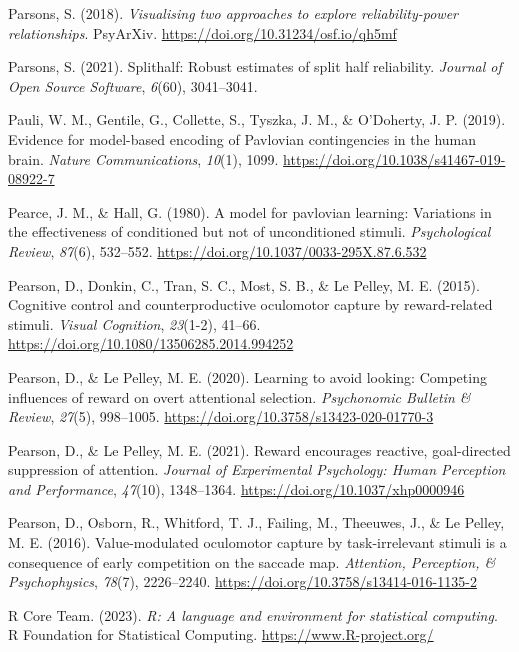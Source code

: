 \documentclass[
  man,
  floatsintext,
  longtable,
  nolmodern,
  notxfonts,
  notimes,
  mask,
  colorlinks=true,linkcolor=blue,citecolor=blue,urlcolor=blue]{apa7}
\newlength{\cslhangindent}
\newenvironment{CSLReferences}[2] %
 {\begin{list}{}{%
  \setlength{\itemindent}{0pt}
  \setlength{\leftmargin}{0pt}
  \setlength{\parsep}{0pt}
  \ifodd #1
   \setlength{\leftmargin}{\cslhangindent}
   \setlength{\itemindent}{-1\cslhangindent}
  \fi
  \setlength{\itemsep}{#2\baselineskip}}}
 {\end{list}}
\begin{document}
\begin{CSLReferences}{1}{0}
Parsons, S. (2018). \emph{Visualising two approaches to explore
reliability-power relationships}. PsyArXiv.
\url{https://doi.org/10.31234/osf.io/qh5mf}

Parsons, S. (2021). Splithalf: Robust estimates of split half
reliability. \emph{Journal of Open Source Software}, \emph{6}(60),
3041--3041.

Pauli, W. M., Gentile, G., Collette, S., Tyszka, J. M., \& O'Doherty, J.
P. (2019). Evidence for model-based encoding of Pavlovian contingencies
in the human brain. \emph{Nature Communications}, \emph{10}(1), 1099.
\url{https://doi.org/10.1038/s41467-019-08922-7}

Pearce, J. M., \& Hall, G. (1980). A model for pavlovian learning:
Variations in the effectiveness of conditioned but not of unconditioned
stimuli. \emph{Psychological Review}, \emph{87}(6), 532--552.
\url{https://doi.org/10.1037/0033-295X.87.6.532}

Pearson, D., Donkin, C., Tran, S. C., Most, S. B., \& Le Pelley, M. E.
(2015). Cognitive control and counterproductive oculomotor capture by
reward-related stimuli. \emph{Visual Cognition}, \emph{23}(1-2), 41--66.
\url{https://doi.org/10.1080/13506285.2014.994252}

Pearson, D., \& Le Pelley, M. E. (2020). Learning to avoid looking:
{Competing} influences of reward on overt attentional selection.
\emph{Psychonomic Bulletin \& Review}, \emph{27}(5), 998--1005.
\url{https://doi.org/10.3758/s13423-020-01770-3}

Pearson, D., \& Le Pelley, M. E. (2021). Reward encourages reactive,
goal-directed suppression of attention. \emph{Journal of Experimental
Psychology: Human Perception and Performance}, \emph{47}(10),
1348--1364. \url{https://doi.org/10.1037/xhp0000946}

Pearson, D., Osborn, R., Whitford, T. J., Failing, M., Theeuwes, J., \&
Le Pelley, M. E. (2016). Value-modulated oculomotor capture by
task-irrelevant stimuli is a consequence of early competition on the
saccade map. \emph{Attention, Perception, \& Psychophysics},
\emph{78}(7), 2226--2240.
\url{https://doi.org/10.3758/s13414-016-1135-2}

R Core Team. (2023). \emph{R: A language and environment for statistical
computing}. R Foundation for Statistical Computing.
\url{https://www.R-project.org/}


\end{CSLReferences}
\end{document}
